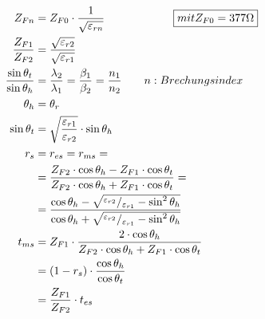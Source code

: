 \begin{align*}
    Z_{Fn}                            & = Z_{F0}\cdot\frac{1}{\sqrt{\varepsilon_{rn}}}  \Aboxed{ mit Z_{F0} = 377\Omega }                                                                               \\
    \frac{Z_{F1}}{Z_{F2}}             & = \frac{\sqrt{\varepsilon_{r2}}}{\sqrt{\varepsilon_{r1}}}                                                                                                       \\
    \frac{\sin\theta_t}{\sin\theta_h} & = \frac{\lambda_2}{\lambda_1}= \frac{\beta_1}{\beta_2}= \frac{n_1}{n_2} \qquad n: Brechungsindex                                                                \\
    \theta_h                          & = \theta_r                                                                                                                                                      \\
    \sin\theta_t                      & = \sqrt{\frac{\varepsilon_{r1}}{\varepsilon_{r2}}}\cdot \sin\theta_h                                                                                            \\
    r_s                               & =  r_{e s} = r_{m s} =                                                                                                                                          \\
                                      & = \frac{Z_{F 2} \cdot \cos \theta_h-Z_{F 1} \cdot \cos \theta_t}{Z_{F 2} \cdot \cos \theta_h+Z_{F 1} \cdot \cos \theta_t} =                                     \\
                                      & = \frac{\cos\theta_h-\sqrt{^{\varepsilon_{r2}}/_{\varepsilon_{r1}}-\sin^2\theta_h}}{\cos\theta_h+\sqrt{^{\varepsilon_{r2}}/_{\varepsilon_{r1}}-\sin^2\theta_h}} \\
    t_{m s}                           & = Z_{F 1} \cdot \frac{2 \cdot \cos \theta_h}{Z_{F 2} \cdot \cos \theta_h+Z_{F 1} \cdot \cos \theta_t}                                                           \\
                                      & = (1 - r_{s}) \cdot \dfrac{\cos \theta_h}{\cos \theta_t}                                                                                                        \\
                                      & = \frac{Z_{F1}}{Z_{F2}}\cdot t_{es}                                                                                                                             \\

\end{align*}
